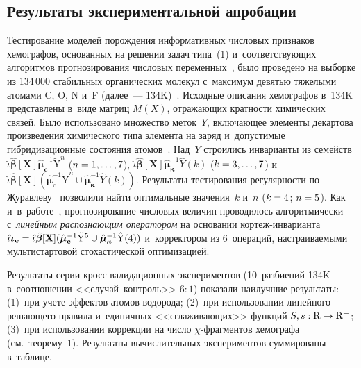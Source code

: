 \begin{multicols}{2}
\section{Результаты экспериментальной апробации}
    
Тестирование моделей порождения информативных числовых признаков 
хемографов, основанных на решении задач типа~(1) и~соответствующих 
алгоритмов прогнозирования числовых переменных~\cite{4-tor}, было 
проведено на выборке из 134\,000 стабильных органических молекул 
с~максимум девятью тяжелыми атомами C, O, N и~F (далее~---  
134K)~\cite{5-tor}. Исходные описания хемографов в~134K представлены в~виде 
матриц ${M}(X)$, отражающих кратности химических связей. Было использовано 
множество меток~$Y$, включающее элементы декартова произведения 
химического типа элемента на заряд и~допустимые гибридизационные 
состояния атомов~\cite{6-tor}. Над~$Y$ строились инварианты из семейств 
$\hat{\iota}\hat{\bm{\beta}}[\mathbf{X}]\hat{\bm{\mu}}_{\mathbf{c}}^{-
1}\tilde{\mathrm{Y}}^n$ ($n\hm=1, \ldots , 7$), 
$\hat{\iota}\hat{\bm{\beta}}[\mathbf{X}]\hat{\bm{\mu}}_{\bm {\kappa}}^{-
1}\hat{Y}(k)$ ($k\hm=3,\ldots , 7$) 
и~$\hat{\iota}\hat{\bm{\beta}}[\mathbf{X}](\hat{\bm{\mu}}^{-1}_{\mathbf{c}} 
\tilde{\mathrm{Y}}^n \cup \hat{\bm{\mu}}^{-1}_{\bm{\kappa}} \hat{Y}(k))$. 
Результаты тестирования регулярности по Журавлеву~\cite{6-tor} позволили 
найти оптимальные значения~$k$ и~$n$ ($k \hm= 4$; $n \hm= 5$). Как 
и~в~работе~\cite{4-tor}, прогнозирование числовых величин проводилось 
алгоритмически с~\textit{линейным распознающим оператором} на основании  
кор\-теж-ин\-ва\-ри\-ан\-та $\hat{\iota}\bm{\iota}_{\mathbf{e}}\hm= \hat{\iota} 
\hat{\bm{\beta}}[\mathbf{X}](\hat{\bm{\mu}}^{-1}_{\mathbf{c}} 
\tilde{\mathrm{Y}}^5 \cup \hat{\bm{\mu}}^{-1}_{\bm{\kappa}} \hat{\mathrm{Y}}(4))$ 
и~корректором из 6~операций, настраиваемыми мультистартовой 
стохастической оптимизацией. 

    Результаты серии кросс-ва\-ли\-да\-ци\-он\-ных экспериментов 
(10~разбиений 134K в~соотношении <<слу\-чай--конт\-роль>> $6:1$) показали 
наилучшие результаты: (1)~при учете эффектов атомов водорода; 
(2)~при использовании линейного решающего правила и~единичных 
<<сглаживающих>> функций ${S,s}: \mathrm{R}\hm\to \mathrm{R}^+$; 
(3)~при использовании коррекции на число $\chi$-фраг\-мен\-тов хемографа (см.\ 
теорему~1). Результаты вычислительных экспериментов суммированы  
в~таб\-лице. 




\end{multicols}
